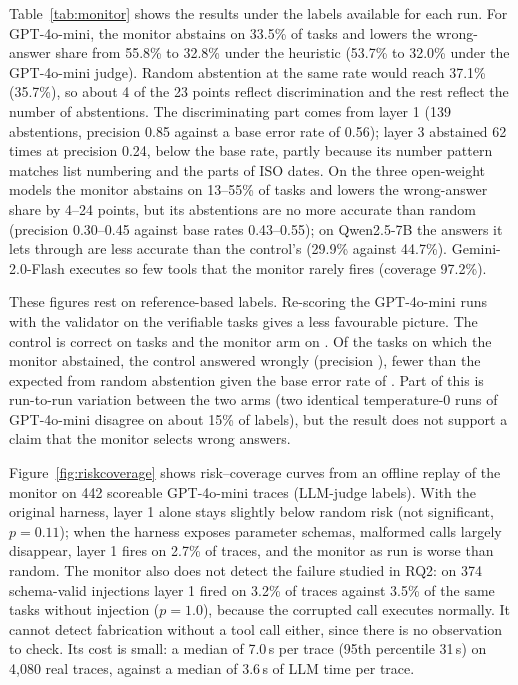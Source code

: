 \documentclass[pdflatex,sn-mathphys-num,Numbered]{sn-jnl}
\begin{document}


Table~\ref{tab:monitor} shows the results under the labels available for each run. For GPT-4o-mini, the monitor abstains on 33.5\% of tasks and lowers the wrong-answer share from 55.8\% to 32.8\% under the heuristic (53.7\% to 32.0\% under the GPT-4o-mini judge). Random abstention at the same rate would reach 37.1\% (35.7\%), so about 4 of the 23 points reflect discrimination and the rest reflect the number of abstentions. The discriminating part comes from layer 1 (139 abstentions, precision 0.85 against a base error rate of 0.56); layer 3 abstained 62 times at precision 0.24, below the base rate, partly because its number pattern matches list numbering and the parts of ISO dates. On the three open-weight models the monitor abstains on 13--55\% of tasks and lowers the wrong-answer share by 4--24 points, but its abstentions are no more accurate than random (precision 0.30--0.45 against base rates 0.43--0.55); on Qwen2.5-7B the answers it lets through are less accurate than the control's (29.9\% against 44.7\%). Gemini-2.0-Flash executes so few tools that the monitor rarely fires (coverage 97.2\%).

These figures rest on reference-based labels. Re-scoring the GPT-4o-mini runs with the validator on the \MonValN{} verifiable tasks gives a less favourable picture. The control is correct on \MonValCtrlCorrect{} tasks and the monitor arm on \MonValIntCorrect{}. Of the \MonValAbst{} tasks on which the monitor abstained, the control answered \MonValCaught{} wrongly (precision \MonValPrec{}), fewer than the \MonValExp{} expected from random abstention given the base error rate of \MonValBase{}. Part of this is run-to-run variation between the two arms (two identical temperature-0 runs of GPT-4o-mini disagree on about 15\% of labels), but the result does not support a claim that the monitor selects wrong answers.

Figure~\ref{fig:riskcoverage} shows risk--coverage curves from an offline replay of the monitor on 442 scoreable GPT-4o-mini traces (LLM-judge labels). With the original harness, layer 1 alone stays slightly below random risk (not significant, $p=0.11$); when the harness exposes parameter schemas, malformed calls largely disappear, layer 1 fires on 2.7\% of traces, and the monitor as run is worse than random. The monitor also does not detect the failure studied in RQ2: on 374 schema-valid injections layer 1 fired on 3.2\% of traces against 3.5\% of the same tasks without injection ($p=1.0$), because the corrupted call executes normally. It cannot detect fabrication without a tool call either, since there is no observation to check. Its cost is small: a median of 7.0\,\textmu s per trace (95th percentile 31\,\textmu s) on 4,080 real traces, against a median of 3.6\,s of LLM time per trace.
\end{document}
